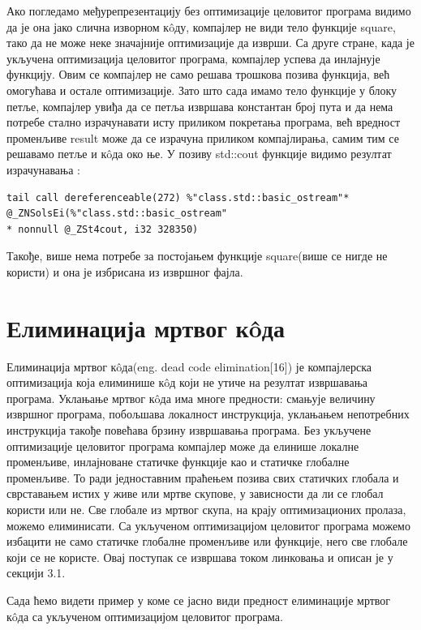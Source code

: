 \documentclass[12pt,oneside]{memoir}
\begin{document}
Ако погледамо међурепрезентацију без оптимизације целовитог програма видимо да је она јако
слична изворном к\^{o}ду, компајлер не види тело функције square, тако да не може неке 
значајније оптимизације да изврши.
Са друге стране, када је укључена оптимизација целовитог програма, компајлер
успева да инлајнује функцију.
Овим се компајлер не само решава трошкова позива функција, већ омогућава и остале оптимизације.
Зато што сада имамо тело функције у блоку петље, компајлер увиђа да се петља извршава константан
број пута и да нема потребе стално израчунавати исту приликом покретања програма, већ вредност
променљиве result може да се израчуна приликом компајлирања, самим тим се решавамо петље и
к\^{o}да око ње.
У позиву std::cout функције видимо резултат израчунавања :
\begin{lstlisting}
tail call dereferenceable(272) %"class.std::basic_ostream"*
@_ZNSolsEi(%"class.std::basic_ostream"
* nonnull @_ZSt4cout, i32 328350)
\end{lstlisting}
Такође, више нема потребе за постојањем функције square(више се нигде не користи)
и она је избрисана из извршног фајла.



\section{Елиминација мртвог к\^{o}да}

Елиминација мртвог к\^{o}да(eng. dead code elimination[16]) је компајлерска 
оптимизација која елиминише к\^{o}д који не утиче на резултат извршавања
програма.
Уклањање мртвог к\^{o}да има многе предности: смањује величину извршног програма,
побољшава локалност инструкција, уклањањем непотребних инструкција такође
повећава брзину извршавања програма.
Без укључене оптимизације целовитог програма компајлер може да елинише локалне
променљиве, инлајноване статичке функције као и статичке глобалне променљиве.
То ради једноставним праћењем позива свих статичких глобала и сврставањем истих
у живе или мртве скупове, у зависности да ли се глобал користи или не.
Све глобале из мртвог скупа, на крају оптимизационих пролаза, можемо елиминисати.
Са укљученом оптимизацијом целовитог програма можемо избацити не само статичке
глобалне променљиве или функције, него све глобале који се не користе.
Овај поступак се извршава током линковања и описан је у секцији  3.1.

Сада ћемо видети пример у коме се јасно види предност елиминације мртвог
к\^{o}да са укљученом оптимизацијом целовитог програма.
\end{document}
